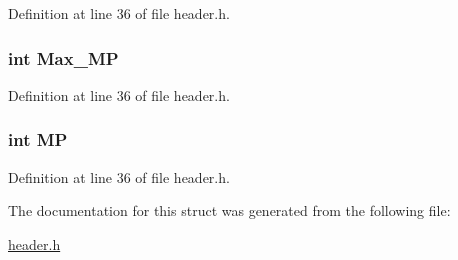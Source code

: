 Definition at line 36 of file header.\-h.

\hypertarget{structt__status_a5e48a681ff3d92aaa0e643fbc32ab2f7}{
\subsubsection[{Max\-\_\-\-M\-P}]{\setlength{\rightskip}{0pt plus 5cm}int Max\-\_\-\-M\-P}}\label{structt__status_a5e48a681ff3d92aaa0e643fbc32ab2f7}


Definition at line 36 of file header.\-h.

\hypertarget{structt__status_a30fc75b90111fc791752dd1add6ed991}{
\subsubsection[{M\-P}]{\setlength{\rightskip}{0pt plus 5cm}int M\-P}}\label{structt__status_a30fc75b90111fc791752dd1add6ed991}


Definition at line 36 of file header.\-h.



The documentation for this struct was generated from the following file\-:\begin{DoxyCompactItemize}
\item 
\hyperlink{header_8h}{header.\-h}\end{DoxyCompactItemize}
